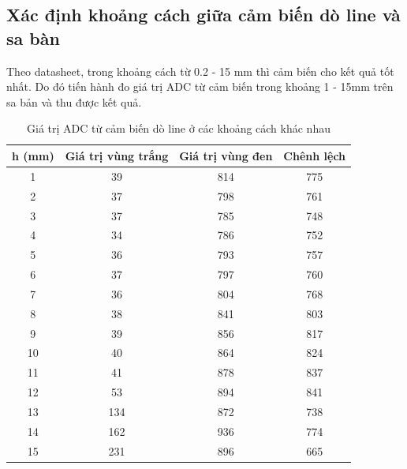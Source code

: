         \subsection{Xác định khoảng cách giữa cảm biến dò line và sa bàn}
            \hspace*{0.6cm}Theo datasheet, trong khoảng cách từ 0.2 - 15 mm thì cảm biến cho kết quả tốt nhất. Do đó tiến hành đo giá trị ADC từ cảm biến trong khoảng 1 - 15mm trên sa bản và thu được kết quả.
            \begin{table}[H]
                \centering
                \begin{tabular}{|c|c|c|c|}
                    \hline
                    \textbf{h (mm)} & \textbf{Giá trị vùng trắng} & \textbf{Giá trị vùng đen} & \textbf{Chênh lệch} \\
                    \hline
                    1 & 39 & 814 & 775 \\
                    \hline
                    2 & 37 & 798 & 761 \\
                    \hline
                    3 & 37 & 785 & 748 \\
                    \hline
                    4 & 34 & 786 & 752 \\
                    \hline
                    5 & 36 & 793 & 757 \\
                    \hline
                    6 & 37 & 797 & 760 \\
                    \hline
                    7 & 36 & 804 & 768 \\
                    \hline
                    \rowcolor{yellow!50}
                    8 & 38 & 841 & 803 \\
                    \hline
                    \rowcolor{yellow!50}
                    9 & 39 & 856 & 817 \\
                    \hline
                    \rowcolor{yellow!50}
                    10 & 40 & 864 & 824 \\
                    \hline
                    \rowcolor{yellow!50}
                    11 & 41 & 878 & 837 \\
                    \hline
                    \rowcolor{yellow!50}
                    12 & 53 & 894 & 841 \\
                    \hline
                    13 & 134 & 872 & 738 \\
                    \hline
                    14 & 162 & 936 & 774 \\
                    \hline
                    15 & 231 & 896 & 665 \\
                    \hline
                \end{tabular}
                \caption{Giá trị ADC từ cảm biến dò line ở các khoảng cách khác nhau}
            \end{table}

